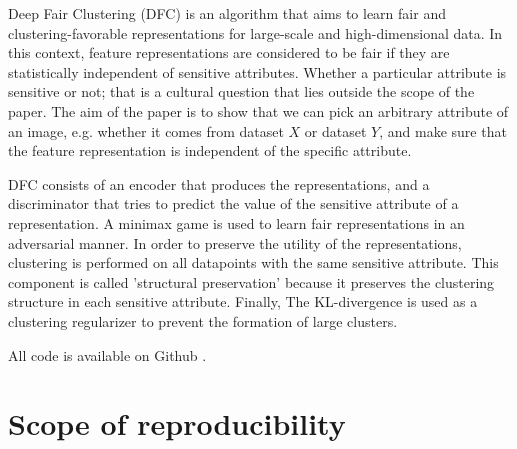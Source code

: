 Deep Fair Clustering (DFC) is an algorithm that aims to learn fair and clustering-favorable representations for large-scale and high-dimensional data. In this context, feature representations are considered to be fair if they are statistically independent of sensitive attributes. Whether a particular attribute is sensitive or not; that is a cultural question that lies outside the scope of the paper. The aim of the paper is to show that we can pick an arbitrary attribute of an image, e.g. whether it comes from dataset $X$ or dataset $Y$, and make sure that the feature representation is independent of the specific attribute. 

DFC consists of an encoder that produces the representations, and a discriminator that tries to predict the value of the sensitive attribute of a representation. A minimax game is used to learn fair representations in an adversarial manner. In order to preserve the utility of the representations, clustering is performed on all datapoints with the same sensitive attribute. This component is called 'structural preservation' because it preserves the clustering structure in each sensitive attribute. Finally, The KL-divergence is used as a clustering regularizer to prevent the formation of large clusters.

All code is available on Github \citep{onze_git}. 


\section{Scope of reproducibility}
\label{sec:claims}



